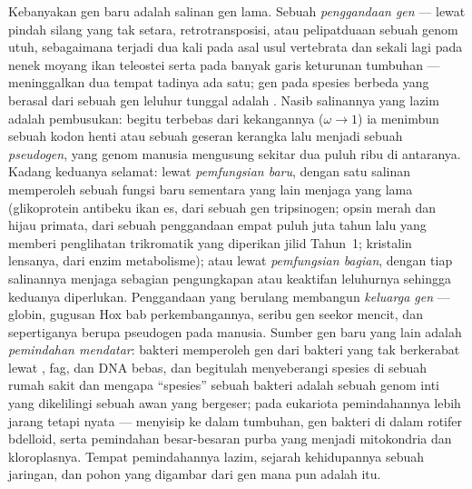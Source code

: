 \begin{definition}\label{def:b3:molecular-evolution:duplication}
%
Kebanyakan gen baru adalah salinan gen lama. Sebuah \emph{penggandaan gen} ---
lewat pindah silang yang tak setara, retrotransposisi, atau pelipatduaan sebuah
genom utuh, sebagaimana terjadi dua kali pada asal usul vertebrata dan sekali lagi
pada nenek moyang ikan teleostei serta pada banyak garis keturunan tumbuhan --- meninggalkan
dua  tempat tadinya ada satu; gen pada spesies berbeda
yang berasal dari sebuah gen leluhur tunggal adalah . Nasib
salinannya yang lazim adalah pembusukan: begitu terbebas dari kekangannya ($\omega \to 1$) ia
menimbun sebuah kodon henti atau sebuah geseran kerangka lalu menjadi sebuah
\emph{pseudogen}, yang genom manusia mengusung sekitar dua puluh
ribu di antaranya. Kadang keduanya selamat: lewat \emph{pemfungsian baru}, dengan satu
salinan memperoleh sebuah fungsi baru sementara yang lain menjaga yang lama (glikoprotein
antibeku ikan es, dari sebuah gen tripsinogen; opsin merah
dan hijau primata, dari sebuah penggandaan empat puluh juta tahun
lalu yang memberi penglihatan trikromatik yang diperikan jilid Tahun~1;
kristalin lensanya, dari enzim metabolisme); atau lewat
\emph{pemfungsian bagian}, dengan tiap salinannya menjaga sebagian pengungkapan
atau keaktifan leluhurnya sehingga keduanya diperlukan. Penggandaan yang berulang
membangun \emph{keluarga gen} --- globin, gugusan Hox bab
perkembangannya, seribu gen  seekor mencit,
dan sepertiganya berupa pseudogen pada manusia. Sumber gen baru yang lain adalah
\emph{pemindahan mendatar}: bakteri memperoleh gen dari bakteri yang tak
berkerabat lewat , fag, dan DNA bebas, dan begitulah  menyeberangi spesies di sebuah rumah sakit dan mengapa
``spesies'' sebuah bakteri adalah sebuah genom inti yang dikelilingi sebuah awan yang bergeser;
pada eukariota pemindahannya lebih jarang tetapi nyata ---  \emph{}
menyisip ke dalam tumbuhan, gen bakteri di dalam rotifer bdelloid, serta
pemindahan besar-besaran purba yang menjadi mitokondria dan
kloroplasnya. Tempat pemindahannya lazim, sejarah kehidupannya sebuah jaringan,
dan pohon yang digambar dari gen mana pun adalah  itu.
\end{definition}

